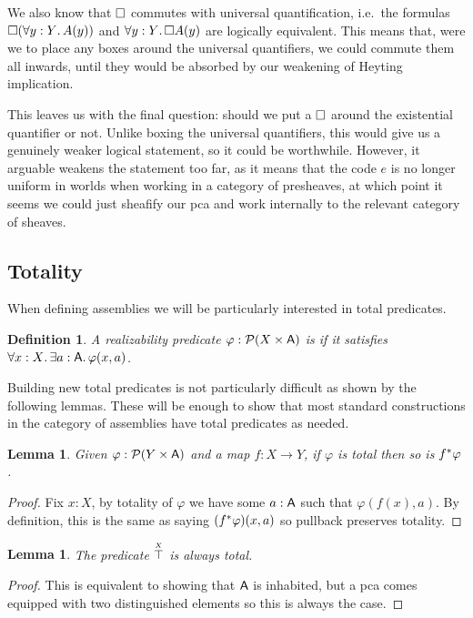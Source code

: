 \documentclass[11pt]{article}
\newtheorem{lemm}[thrm]{Lemma}
\newtheorem{defn}[thrm]{Definition}
\begin{document}
We also know that \(\Box\) commutes with universal quantification, i.e.\ the
formulas \(\Box{(\forall{y:Y}.\,{A(y)})}\) and \(\forall{y:Y}.\,{\Box{A(y)}}\) are
logically equivalent.
%
This means that, were we to place any boxes around the universal quantifiers,
we could commute them all inwards, until they would be absorbed
by our weakening of Heyting implication.

This leaves us with the final question: should we put a \(\Box\) around
the existential quantifier or not.
%
Unlike boxing the universal quantifiers, this would give us a genuinely weaker
logical statement, so it could be worthwhile.
%
However, it arguable weakens the statement too far, as it means that
the code \(e\) is no longer uniform in worlds when working in a
category of presheaves, at which point it seems we could just sheafify
our pca and work internally to the relevant category of sheaves.


\subsection{Totality}

When defining assemblies we will be particularly interested in total
predicates.

\begin{defn}\label{defn:tripos-total-predicates}
  A realizability predicate \(\varphi : \mathcal{P}{({X}\times{\ensuremath{\mathsf{A}}})}\) is 
  if it satisfies \(\forall{x:X}.\,{\exists{a:\ensuremath{\mathsf{A}}}.\,{\varphi(x,a)}}\).
\end{defn}

Building new total predicates is not particularly difficult as shown by
the following lemmas.
%
These will be enough to show that most standard constructions in the
category of assemblies have total predicates as needed.

\begin{lemm}\label{lemm:pullback-preserves-total}
  Given \(\varphi : \mathcal{P}{({Y}\times{\ensuremath{\mathsf{A}}})}\) and a map \(f : X \to Y\), if
  \(\varphi\) is total then so is \({f}^\ast\varphi\).
\end{lemm}
\begin{proof}
  Fix \(x:X\), by totality of \(\varphi\) we have some \(a:\mathsf{A}\) such that
  \(\varphi(f(x),a)\).
  By definition, this is the same as saying \(({f}^\ast\varphi)(x,a)\) so
  pullback preserves totality.
\end{proof}

\begin{lemm}\label{lemm:top-total}
  The predicate \(\overset{\scriptscriptstyle X}{\top}\) is always total.
\end{lemm}
\begin{proof}
  This is equivalent to showing that \(\mathsf{A}\) is inhabited, but a pca
  comes equipped with two distinguished elements so this is always the case.
\end{proof}
\end{document}

